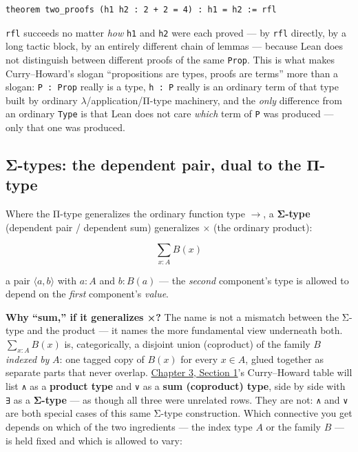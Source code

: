 \begin{lstlisting}
theorem two_proofs (h1 h2 : 2 + 2 = 4) : h1 = h2 := rfl
\end{lstlisting}

\texttt{rfl} succeeds no matter \emph{how} \texttt{h1} and \texttt{h2} were each proved --- by \texttt{rfl} directly, by a long tactic block, by an entirely different chain of lemmas --- because Lean does not distinguish between different proofs of the same \texttt{Prop}. This is what makes Curry--Howard's slogan ``propositions are types, proofs are terms'' more than a slogan: \texttt{P : Prop} really is a type, \texttt{h : P} really is an ordinary term of that type built by ordinary \(\lambda\)/application/Π-type machinery, and the \emph{only} difference from an ordinary \texttt{Type} is that Lean does not care \emph{which} term of \texttt{P} was produced --- only that one was produced.

\subsection{Σ-types: the dependent pair, dual to the Π-type}\label{sec:01-basics:05-pi-sigma-and-coc:5}

Where the Π-type generalizes the ordinary function type \(\to\), a \textbf{Σ-type} (dependent pair / dependent sum) generalizes \(\times\) (the ordinary product):

\[
\sum_{x:A} B(x)
\]

a pair \(\langle a, b\rangle\) with \(a : A\) and \(b : B(a)\) --- the \emph{second} component's type is allowed to depend on the \emph{first} component's \emph{value}.

\textbf{Why ``sum,'' if it generalizes ×?} The name is not a mismatch between the Σ-type and the product --- it names the more fundamental view underneath both. \(\sum_{x:A} B(x)\) is, categorically, a disjoint union (coproduct) of the family \(B\) \emph{indexed by} \(A\): one tagged copy of \(B(x)\) for every \(x \in A\), glued together as separate parts that never overlap. \hyperref[sec:03-propositions-and-proofs:01-prop:1]{Chapter 3, Section 1}'s Curry--Howard table will list \texttt{∧} as a \textbf{product type} and \texttt{∨} as a \textbf{sum (coproduct) type}, side by side with \texttt{∃} as a \textbf{Σ-type} --- as though all three were unrelated rows. They are not: \texttt{∧} and \texttt{∨} are both special cases of this same Σ-type construction. Which connective you get depends on which of the two ingredients --- the index type \(A\) or the family \(B\) --- is held fixed and which is allowed to vary:

